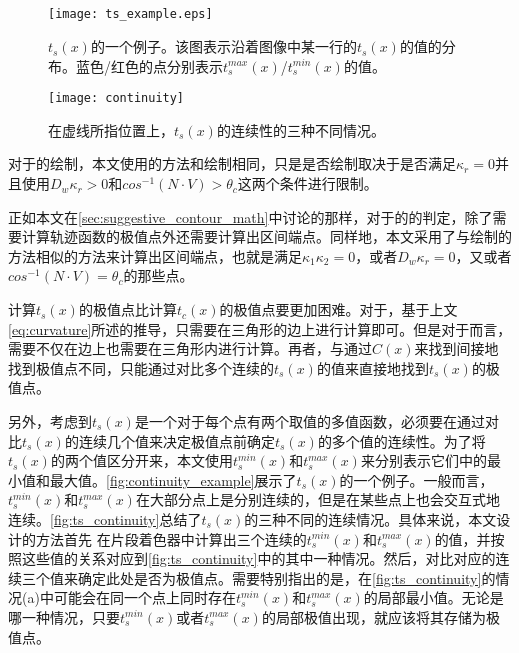 {\subsection{\scon{}}

\begin{figure}[tbh]
    \centering
    \texttt{[image: ts\_example.eps]}
    \caption{\label{fig:continuity_example}
    $t_s(x)$的一个例子。该图表示沿着图像中某一行的$t_s(x)$的值的分布。蓝色/红色的点分别表示$t_s^{max}(x)$/$t_s^{min}(x)$的值。}
\end{figure}

\begin{figure}[tbh]
    \centering
    \texttt{[image: continuity]}
    \caption{在虚线所指位置上，$t_s(x)$的连续性的三种不同情况。}
    \label{fig:ts_continuity}
\end{figure}

\label{sec:suggestive_contour_algorithm}
对于\scon{}的绘制，本文使用的方法和绘制\con{}相同，只是是否绘制取决于是否满足$\kappa_r = 0$并且使用$D_w\kappa_r > 0$和$cos^{-1}(N\cdot{V}) > \theta_c$这两个条件进行限制。

正如本文在\ref{sec:suggestive_contour_math}中讨论的那样，对于\scon{}的\epsl{}的判定，除了需要计算轨迹函数的极值点外还需要计算出区间端点。同样地，本文采用了与绘制\con{}的方法相似的方法来计算出区间端点，也就是满足$\kappa_1\kappa_2 = 0$，或者$D_w\kappa_r = 0$，又或者$cos^{-1}(N\cdot{V}) = \theta_c$的那些点。

计算$t_s(x)$的极值点比计算$t_c(x)$的极值点要更加困难。对于\con{}，基于上文\autoref{eq:curvature}所述的推导，只需要在三角形的边上进行计算即可。但是对于\scon{}而言，需要不仅在边上也需要在三角形内进行计算。再者，与通过$C(x)$来找到间接地找到极值点不同，只能通过对比多个连续的$t_s(x)$的值来直接地找到$t_s(x)$的极值点。

另外，考虑到$t_s(x)$是一个对于每个点有两个取值的多值函数，必须要在通过对比$t_s(x)$的连续几个值来决定极值点前确定$t_s(x)$的多个值的连续性。为了将$t_s(x)$的两个值区分开来，本文使用$t_s^{min}(x)$和$t_s^{max}(x)$来分别表示它们中的最小值和最大值。\autoref{fig:continuity_example}展示了$t_s(x)$的一个例子。一般而言，$t_s^{min}(x)$和$t_s^{max}(x)$在大部分点上是分别连续的，但是在某些点上也会交互式地连续。\autoref{fig:ts_continuity}总结了$t_s(x)$的三种不同的连续情况。具体来说，本文设计的方法首先
在片段着色器中计算出三个连续的$t_s^{min}(x)$和$t_s^{max}(x)$的值，并按照这些值的关系对应到\autoref{fig:ts_continuity}中的其中一种情况。然后，对比对应的连续三个值来确定此处是否为极值点。需要特别指出的是，在\autoref{fig:ts_continuity}的情况(a)中可能会在同一个点上同时存在$t_s^{min}(x)$和$t_s^{max}(x)$的局部最小值。无论是哪一种情况，只要$t_s^{min}(x)$或者$t_s^{max}(x)$的局部极值出现，就应该将其存储为极值点。

}
